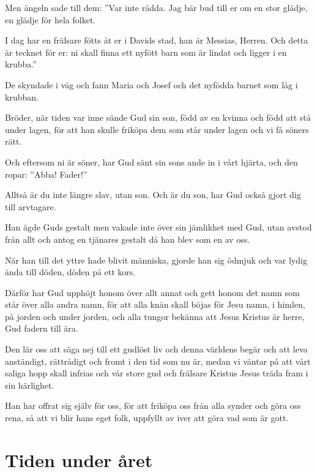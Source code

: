  Men ängeln sade till dem: ''Var inte rädda. Jag bär bud till er om en stor glädje, en glädje för hela folket. 
 
 I dag har en frälsare fötts åt er i Davids stad, han är Messias, Herren. 
 Och detta är tecknet för er: ni skall finna ett nyfött barn som är lindat och ligger i en krubba.'' 
 
 De skyndade i väg och fann Maria och Josef och det nyfödda barnet som låg i krubban.

{Bröder, när tiden var inne sände Gud sin son, född av en kvinna och född att stå under lagen, 
 för att han skulle friköpa dem som står under lagen och vi få söners rätt. }
 
 Och eftersom ni är söner, har Gud sänt sin sons ande in i vårt hjärta, och den ropar: ''Abba! Fader!'' 
 
 Alltså är du inte längre slav, utan son. Och är du son, har Gud också gjort dig till arvtagare.


{Han ägde Guds gestalt men vakade inte över sin jämlikhet med Gud, 
 utan avstod från allt och antog en tjänares gestalt då han blev som en av oss. }
 
 När han till det yttre hade blivit människa, 
 gjorde han sig ödmjuk och var lydig ända till döden, döden på ett kors. 
 
 Därför har Gud upphöjt honom över allt annat och gett honom det namn som står över alla andra namn, 
 för att alla knän skall böjas för Jesu namn, i himlen, på jorden och under jorden, 
 och alla tungor bekänna att Jesus Kristus är herre, Gud fadern till ära.



 Den lär oss att säga nej till ett gudlöst liv och denna världens begär och att leva anständigt, rättrådigt och fromt i den tid som nu är, 
 medan vi väntar på att vårt saliga hopp skall infrias och vår store gud och frälsare Kristus Jesus träda fram i sin härlighet. 
 
 Han har offrat sig själv för oss, för att friköpa oss från alla synder och göra oss rena, så att vi blir hans eget folk, uppfyllt av iver att göra vad som är gott. \enlargethispage{\baselineskip}
\newpage
\section{Tiden under året}

